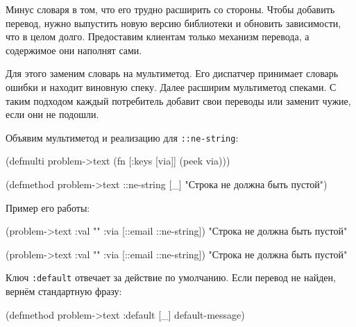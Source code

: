 Минус словаря в том, что его трудно расширить со стороны. Чтобы добавить
перевод, нужно выпустить новую версию библиотеки и обновить зависимости, что в
целом долго. Предоставим клиентам только механизм перевода, а содержимое они
наполнят сами.

Для этого заменим словарь на мультиметод. Его диспатчер принимает словарь ошибки
и находит виновную спеку. Далее расширим мультиметод спеками. С таким подходом
каждый потребитель добавит свои переводы или заменит чужие, если они не подошли.

Объявим мультиметод и реализацию для \texttt{::ne\--string}:


  \begin{clojure}
(defmulti problem->text
  (fn [{:keys [via]}]
    (peek via)))

(defmethod problem->text ::ne-string [_]
  "Строка не должна быть пустой")
  \end{clojure}

\noindent
Пример его работы:

\ifx\DEVICETYPE\MOBILE

  \begin{clojure}
(problem->text
  {:val "" :via [::email ::ne-string]})
"Строка не должна быть пустой"
  \end{clojure}

\else

  \begin{clojure}
(problem->text {:val "" :via [::email ::ne-string]})
"Строка не должна быть пустой"
  \end{clojure}

\fi

Ключ \verb|:default| отвечает за действие по умолчанию. Если перевод не
найден, вернём стандартную фразу:

\begin{english}
  \begin{clojure}
(defmethod problem->text :default [_]
  default-message)
  \end{clojure}
\end{english}

